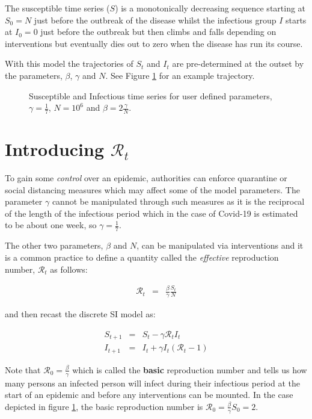\documentclass[11pt]{article}
\begin{document}
The susceptible time series ($S$) is a monotonically decreasing sequence
starting at $S_0 = N$ just before the outbreak of the disease whilst the infectious 
group $I$ starts at $I_0 = 0$ just before the outbreak but then climbs and falls
depending on interventions but eventually dies out to zero when
the disease has run its course. 

With this model the trajectories of $S_t$ and $I_t$ are pre-determined at the outset by
the parameters, $\beta$, $\gamma$ and $N$. See Figure \ref{fig1} for an
example trajectory.

\begin{figure}[ht]
\begin{center}
\end{center}
\caption{Susceptible and Infectious time series
for user defined parameters, $\gamma = \frac{1}{7}$, $N=10^6$ and $\beta = 2 \frac{\gamma}{N}$.
}  
\label{fig1}
\end{figure}

\section{Introducing $\mathcal{R}_t$}

To gain some {\it control} over an epidemic, authorities can enforce quarantine or
social distancing measures which may affect some of the model parameters.
The parameter $\gamma$ cannot be manipulated through such measures
as it is the reciprocal of the length of the infectious period which in the case of
Covid-19 is estimated to be about one week, so $\gamma = \frac{1}{7}$.

The other two parameters, $\beta$ and $N$, can be manipulated via interventions
and it is a common practice to define a quantity called the {\it effective} reproduction number, 
$\mathcal{R}_t$ as follows:

\begin{eqnarray}
\mathcal{R}_{t} & = & \frac{\beta}{\gamma}\frac{S_t}{N} \label{eq2} 
\end{eqnarray}

and then recast the discrete SI model as:

\begin{eqnarray}
S_{t+1} & = & S_t - \gamma \mathcal{R}_t  I_t \label{eq3a} \\
I_{t+1} & = & I_t +\gamma  I_t ( \mathcal{R}_t - 1 ) \label{eq3b} 
\end{eqnarray}

Note that $ \mathcal{R}_0 = \frac{\beta}{\gamma} $
which is called the {\bf basic} reproduction number and tells us how many
persons an infected person will infect during their infectious period at the
start of an epidemic and before any interventions can be mounted.
In the case depicted in figure \ref{fig1}, the basic reproduction number is
$\mathcal{R}_0 = \frac{\beta}{\gamma} S_0 = 2 $.
\end{document}
